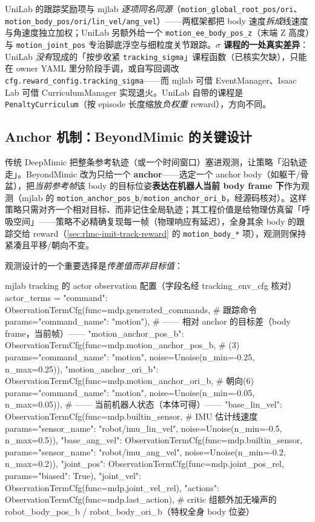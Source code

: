 UniLab 的跟踪奖励项与 mjlab \emph{逐项同名同源}（\verb|motion_global_root_pos/ori|、\verb|motion_body_pos/ori/lin_vel/ang_vel|）——两框架都把 body 速度\emph{拆成}线速度与角速度独立加权；UniLab 另额外给一个 \verb|motion_ee_body_pos_z|（末端 Z 高度）与 \verb|motion_joint_pos| 专治脚底浮空与细粒度关节跟踪。\textbf{$\sigma$ 课程的一处真实差异}：UniLab \emph{没有}现成的「按步收紧 \texttt{tracking\_sigma}」课程函数（已核实欠缺），只能在 owner YAML 里分阶段手调，或自写回调改 \verb|cfg.reward_config.tracking_sigma|——而 mjlab 可借 EventManager、Isaac Lab 可借 CurriculumManager 实现退火。UniLab 自带的课程是 \verb|PenaltyCurriculum|（按 episode 长度缩放\emph{负权重} reward），方向不同。

\subsection{Anchor 机制：BeyondMimic 的关键设计}
\label{sec:rlmc-imit-track-anchor}

传统 DeepMimic 把整条参考轨迹（或一个时间窗口）塞进观测，让策略「沿轨迹走」。BeyondMimic 改为只给一个 \textbf{anchor}——选定一个 anchor body（如躯干/骨盆），把\emph{当前参考帧}该 body 的目标位姿\textbf{表达在机器人当前 body frame 下}作为观测（mjlab 的 \verb|motion_anchor_pos_b|/\verb|motion_anchor_ori_b|，经源码核对）。这样策略只需对齐一个相对目标、而非记住全局轨迹；其工程价值是给物理仿真留「呼吸空间」——策略不必精确复现每一帧（物理响应有延迟），全身其余 body 的跟踪交给 reward（\cref{sec:rlmc-imit-track-reward} 的 \verb|motion_body_*| 项），观测则保持紧凑且平移/朝向不变。

观测设计的一个重要选择是\emph{传差值而非目标值}：

\begin{codebox}[Python]{mjlab tracking 的 actor observation 配置（字段名经 tracking\_env\_cfg 核对）}
actor_terms = {
    "command":   ObservationTermCfg(func=mdp.generated_commands,  # 跟踪命令
                                    params={"command_name": "motion"}),
    # —— 相对 anchor 的目标差（body frame，当前帧）——
    "motion_anchor_pos_b": ObservationTermCfg(func=mdp.motion_anchor_pos_b,   # (3)
        params={"command_name": "motion"}, noise=Unoise(n_min=-0.25, n_max=0.25)),
    "motion_anchor_ori_b": ObservationTermCfg(func=mdp.motion_anchor_ori_b,   # 朝向(6)
        params={"command_name": "motion"}, noise=Unoise(n_min=-0.05, n_max=0.05)),
    # —— 当前机器人状态（本体可得）——
    "base_lin_vel": ObservationTermCfg(func=mdp.builtin_sensor,   # IMU 估计线速度
        params={"sensor_name": "robot/imu_lin_vel"}, noise=Unoise(n_min=-0.5, n_max=0.5)),
    "base_ang_vel": ObservationTermCfg(func=mdp.builtin_sensor,
        params={"sensor_name": "robot/imu_ang_vel"}, noise=Unoise(n_min=-0.2, n_max=0.2)),
    "joint_pos": ObservationTermCfg(func=mdp.joint_pos_rel, params={"biased": True}),
    "joint_vel": ObservationTermCfg(func=mdp.joint_vel_rel),
    "actions":   ObservationTermCfg(func=mdp.last_action),
}
# critic 组额外加无噪声的 robot_body_pos_b / robot_body_ori_b（特权全身 body 位姿）
\end{codebox}

